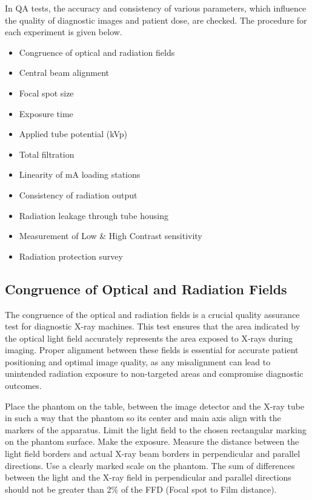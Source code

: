 In QA tests, the accuracy and consistency of various parameters, which influence the quality of diagnostic images and patient dose, are checked. The procedure for each experiment is given below.
\begin{itemize}
    \item Congruence of optical and radiation fields
    \item Central beam alignment
    \item Focal spot size
    \item Exposure time
    \item Applied tube potential (kVp)
    \item Total filtration
    \item Linearity of mA loading stations
    \item Consistency of radiation output
    \item Radiation leakage through tube housing
    \item Measurement of Low \& High Contrast sensitivity
    \item Radiation protection survey
\end{itemize}

\subsection{Congruence of Optical and Radiation Fields}
The congruence of the optical and radiation fields is a crucial quality assurance test for diagnostic X-ray machines. This test ensures that the area indicated by the optical light field accurately represents the area exposed to X-rays during imaging. Proper alignment between these fields is essential for accurate patient positioning and optimal image quality, as any misalignment can lead to unintended radiation exposure to non-targeted areas and compromise diagnostic outcomes.

Place the phantom on the table, between the image detector and the X-ray tube in such a way that the phantom so its center and main axis align with the markers of the apparatus. Limit the light field to the chosen rectangular marking on the phantom surface. Make the exposure. Measure the distance between the light field borders and actual X-ray beam borders in perpendicular and parallel directions. Use a clearly marked scale on the phantom. The sum of differences between the light and the X-ray field in perpendicular and parallel directions should not be greater than 2\% of the FFD (Focal spot to Film distance).

